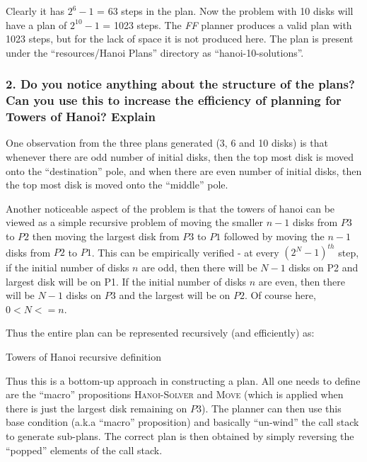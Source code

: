 \documentclass[10pt, letter]{article}
\begin{document}
Clearly it has $2^6 - 1$ = 63 steps in the plan. Now the problem with 10 disks will have a plan of $2^{10} - 1$ = 1023 steps. The \textit{FF} planner produces a valid plan with 1023 steps, but for the lack of space it is not produced here. The plan is present under the ``resources/Hanoi Plans'' directory as ``hanoi-10-solutions''.

\subsubsection*{2. Do you notice anything about the structure of the plans? Can you use this to increase the
efficiency of planning for Towers of Hanoi? Explain}
One observation from the three plans generated (3, 6 and 10 disks) is that whenever there are odd number of initial disks, then the top most disk is moved onto the ``destination'' pole, and when there are even number of initial disks, then the top most disk is moved onto the ``middle'' pole.

Another noticeable aspect of the problem is that the towers of hanoi can be viewed as a simple recursive problem of moving the smaller $n-1$ disks from $P3$ to $P2$ then moving the largest disk from $P3$ to $P1$ followed by moving the $n-1$ disks from $P2$ to $P1$. This can be empirically verified - at every $(2^N - 1)^{th}$ step, if the initial number of disks $n$ are odd, then there will be $N-1$ disks on P2 and largest disk will be on P1. If the initial number of disks $n$ are even, then there will be $N-1$ disks on $P3$ and the largest will be on $P2$. Of course here, $0<N<=n$.

Thus the entire plan can be represented recursively (and efficiently) as: 
\begin{algorithm}
  \caption{Towers of Hanoi recursive definition}
  \begin{algorithmic}[1]
		\State {}
		\State {} 
	  	\State {}
    \EndFunction
  \end{algorithmic}
\end{algorithm}

Thus this is a bottom-up approach in constructing a plan. All one needs to define are the ``macro'' propositions \textsc{Hanoi-Solver} and \textsc{Move} (which is applied when there is just the largest disk remaining on $P3$). The planner can then use this base condition (a.k.a ``macro'' proposition) and basically ``un-wind'' the call stack to generate sub-plans. The correct plan is then obtained by simply reversing the ``popped'' elements of the call stack.
\end{document}
